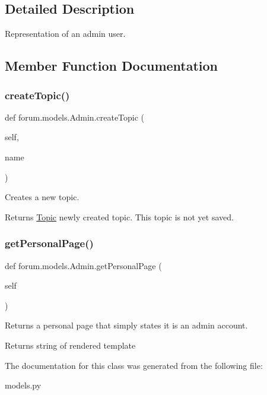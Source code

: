 \subsection{Detailed Description}
Representation of an admin user. 

\subsection{Member Function Documentation}
\mbox{\label{classforum_1_1models_1_1_admin_aed8021d22941a872674e8ea35bbea7f4}} 
\subsubsection{\texorpdfstring{create\+Topic()}{createTopic()}}
{\footnotesize\ttfamily def forum.\+models.\+Admin.\+create\+Topic (\begin{DoxyParamCaption}\item[{}]{self,  }\item[{}]{name }\end{DoxyParamCaption})}



Creates a new topic. 

\begin{DoxyReturn}{Returns}
\mbox{\hyperlink{classforum_1_1models_1_1_topic}{Topic}} newly created topic. This topic is not yet saved. 
\end{DoxyReturn}
\mbox{\label{classforum_1_1models_1_1_admin_a515dd47f6f4f8d93cf8c346af2484673}} 
\subsubsection{\texorpdfstring{get\+Personal\+Page()}{getPersonalPage()}}
{\footnotesize\ttfamily def forum.\+models.\+Admin.\+get\+Personal\+Page (\begin{DoxyParamCaption}\item[{}]{self }\end{DoxyParamCaption})}



Returns a personal page that simply states it is an admin account. 

\begin{DoxyReturn}{Returns}
string of rendered template 
\end{DoxyReturn}


The documentation for this class was generated from the following file\+:\begin{DoxyCompactItemize}
\item 
models.\+py\end{DoxyCompactItemize}
